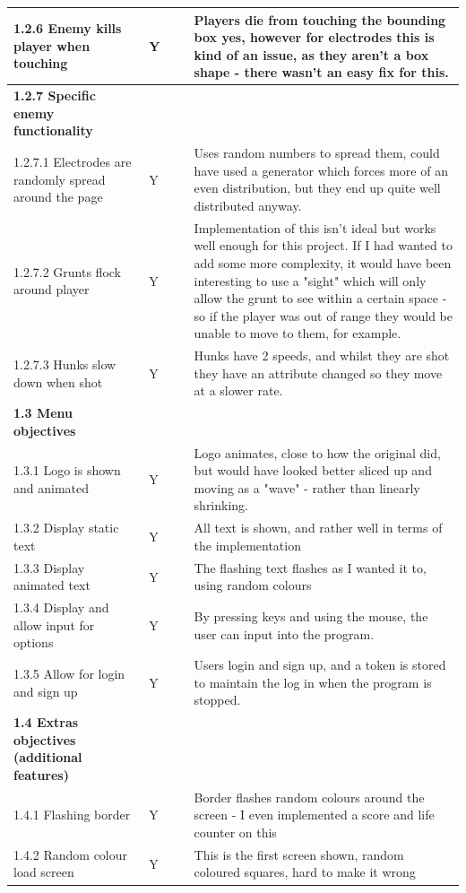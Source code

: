 \begin{longtable}{|p{0.3\linewidth}|p{0.1\linewidth}|p{0.6\linewidth}|}
1.2.6 Enemy kills player when touching & Y & Players die from touching the bounding box yes, however for electrodes this is kind of an issue, as they aren't a box shape - there wasn't an easy fix for this. \\ \hline
\textbf{1.2.7 Specific enemy functionality} &  &  \\ \hline
1.2.7.1 Electrodes are randomly spread around the page & Y & Uses random numbers to spread them, could have used a generator which forces more of an even distribution, but they end up quite well distributed anyway. \\ \hline
1.2.7.2 Grunts flock around player & Y & Implementation of this isn't ideal but works well enough for this project. If I had wanted to add some more complexity, it would have been interesting to use a "sight" which will only allow the grunt to see within a certain space - so if the player was out of range they would be unable to move to them, for example. \\ \hline
1.2.7.3 Hunks slow down when shot & Y & Hunks have 2 speeds, and whilst they are shot they have an attribute changed so they move at a slower rate. \\ \hline
\textbf{1.3 Menu objectives} &  &  \\ \hline
1.3.1 Logo is shown and animated & Y & Logo animates, close to how the original did, but would have looked better sliced up and moving as a "wave" - rather than linearly shrinking. \\ \hline
1.3.2 Display static text & Y & All text is shown, and rather well in terms of the implementation \\ \hline
1.3.3 Display animated text & Y & The flashing text flashes as I wanted it to, using random colours \\ \hline
1.3.4 Display and allow input for options & Y & By pressing keys and using the mouse, the user can input into the program. \\ \hline
1.3.5 Allow for login and sign up & Y & Users login and sign up, and a token is stored to maintain the log in when the program is stopped. \\ \hline
\textbf{1.4 Extras objectives (additional features)} &  &  \\ \hline
1.4.1 Flashing border & Y & Border flashes random colours around the screen - I even implemented a score and life counter on this \\ \hline
1.4.2 Random colour load screen & Y & This is the first screen shown, random coloured squares, hard to make it wrong \\ \hline

\end{longtable}
